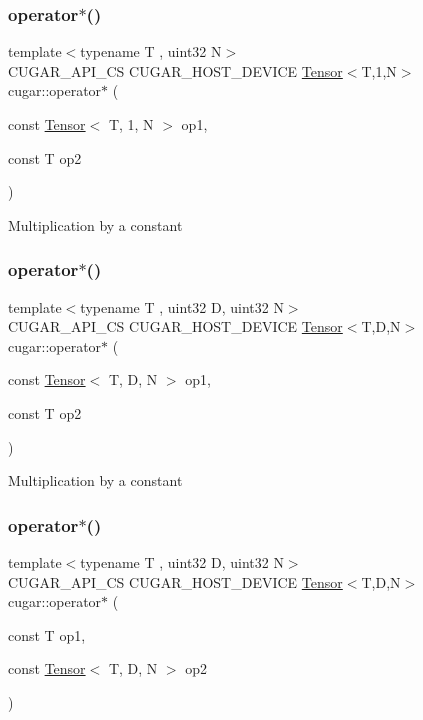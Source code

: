\subsubsection{\texorpdfstring{operator$\ast$()}{operator*()}\hspace{0.1cm}{\footnotesize\ttfamily [2/6]}}
{\footnotesize\ttfamily template$<$typename T , uint32 N$>$ \\
C\+U\+G\+A\+R\+\_\+\+A\+P\+I\+\_\+\+CS C\+U\+G\+A\+R\+\_\+\+H\+O\+S\+T\+\_\+\+D\+E\+V\+I\+CE \hyperlink{structcugar_1_1_tensor}{Tensor}$<$T,1,N$>$ cugar\+::operator$\ast$ (\begin{DoxyParamCaption}\item[{const \hyperlink{structcugar_1_1_tensor}{Tensor}$<$ T, 1, N $>$}]{op1,  }\item[{const T}]{op2 }\end{DoxyParamCaption})}

Multiplication by a constant \mbox{\label{namespacecugar_a948fa225b6b9d9c9fe4c8e292ae89b27}} 
\subsubsection{\texorpdfstring{operator$\ast$()}{operator*()}\hspace{0.1cm}{\footnotesize\ttfamily [3/6]}}
{\footnotesize\ttfamily template$<$typename T , uint32 D, uint32 N$>$ \\
C\+U\+G\+A\+R\+\_\+\+A\+P\+I\+\_\+\+CS C\+U\+G\+A\+R\+\_\+\+H\+O\+S\+T\+\_\+\+D\+E\+V\+I\+CE \hyperlink{structcugar_1_1_tensor}{Tensor}$<$T,D,N$>$ cugar\+::operator$\ast$ (\begin{DoxyParamCaption}\item[{const \hyperlink{structcugar_1_1_tensor}{Tensor}$<$ T, D, N $>$}]{op1,  }\item[{const T}]{op2 }\end{DoxyParamCaption})}

Multiplication by a constant \mbox{\label{namespacecugar_a9127e90e4c449bd8c893feef996e5a97}} 
\subsubsection{\texorpdfstring{operator$\ast$()}{operator*()}\hspace{0.1cm}{\footnotesize\ttfamily [4/6]}}
{\footnotesize\ttfamily template$<$typename T , uint32 D, uint32 N$>$ \\
C\+U\+G\+A\+R\+\_\+\+A\+P\+I\+\_\+\+CS C\+U\+G\+A\+R\+\_\+\+H\+O\+S\+T\+\_\+\+D\+E\+V\+I\+CE \hyperlink{structcugar_1_1_tensor}{Tensor}$<$T,D,N$>$ cugar\+::operator$\ast$ (\begin{DoxyParamCaption}\item[{const T}]{op1,  }\item[{const \hyperlink{structcugar_1_1_tensor}{Tensor}$<$ T, D, N $>$}]{op2 }\end{DoxyParamCaption})}

